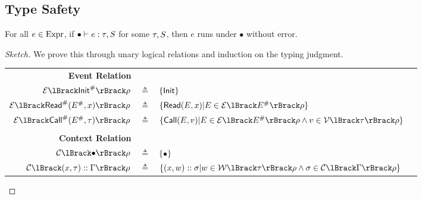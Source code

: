 \subsection{Type Safety}
\begin{theorem}\normalfont
  For all $e\in\text{Expr}$, if ${\bullet}\vdash{e}:{\tau},{S}$ for some $\tau,S$, then $e$ runs under $\bullet$ without error.
\end{theorem}
\begin{proof}[Sketch]
  We prove this through unary logical relations and induction on the typing judgment.

  \begin{tabular}{r@{\hskip2pt}c@{\hskip2pt}l@{\hskip1pt}r}
    \textbf{Event Relation}                        &              &                                                                                                                  & \fbox{$\EvtRel{\Abs\event}\rho$}   \\
    $\EvtRel{\Abs\InitE}\rho$                      & $\triangleq$ & $\{\textsf{Init}\}$                                                                                                                                          \\
    $\EvtRel{\Abs\ReadE(\Abs\event,x)}\rho$        & $\triangleq$ & $\{\ReadE(\event,x)|\event\in\EvtRel{\Abs\event}\rho\}$                                                                                               \\
    $\EvtRel{\Abs\CallE(\Abs\event,\tau)}\rho$     & $\triangleq$ & $\{\CallE(\event,v)|\event\in\EvtRel{\Abs\event}\rho\land v\in\ValRel{\tau}\rho\}$                                                                    \\
    \\
    \textbf{Context Relation}                      &              &                                                                                                                  & \fbox{$\CtxRel{\Gamma}\rho$}       \\
    $\CtxRel{\bullet}\rho$                         & $\triangleq$ & $\{\bullet\}$                                                                                                                                         \\
    $\CtxRel{(x,\tau)\cons\Gamma}\rho$             & $\triangleq$ & $\{(x,w)\cons\ctx|w\in\WalRel{\tau}\rho\land\ctx\in\CtxRel{\Gamma}\rho\}$                                                                             \\

\end{tabular}
\end{proof}

